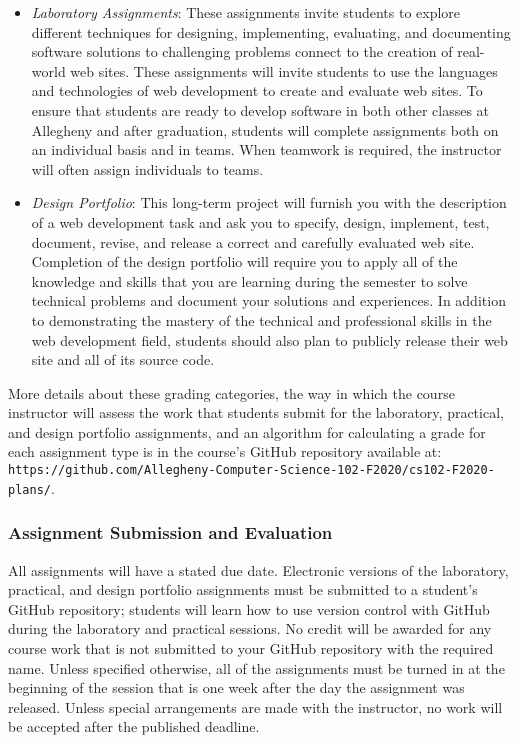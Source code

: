 \documentclass[11pt]{article}
\newcommand{\url}[1]{\lstinline{#1}}
\begin{document}
\begin{itemize}
  \item {\em Laboratory Assignments\/}: These assignments invite students to
    explore different techniques for designing, implementing, evaluating, and
    documenting software solutions to challenging problems connect to the
    creation of real-world web sites. These assignments will invite students to
    use the languages and technologies of web development to create and evaluate
    web sites. To ensure that students are ready to develop software in both
    other classes at Allegheny and after graduation, students will complete
    assignments both on an individual basis and in teams. When teamwork is
    required, the instructor will often assign individuals to teams.

  \item {\em Design Portfolio\/}: This long-term project will furnish you with
    the description of a web development task and ask you to specify, design,
    implement, test, document, revise, and release a correct and carefully
    evaluated web site. Completion of the design portfolio will require you to
    apply all of the knowledge and skills that you are learning during the
    semester to solve technical problems and document your solutions and
    experiences. In addition to demonstrating the mastery of the technical and
    professional skills in the web development field, students should also plan
    to publicly release their web site and all of its source code.

\end{itemize}

\noindent More details about these grading categories, the way in which the
course instructor will assess the work that students submit for the laboratory,
practical, and design portfolio assignments, and an algorithm for calculating a
grade for each assignment type is in the course's GitHub repository available
at:
\url{https://github.com/Allegheny-Computer-Science-102-F2020/cs102-F2020-plans/}.

\subsubsection*{Assignment Submission and Evaluation}

All assignments will have a stated due date. Electronic versions of the
laboratory, practical, and design portfolio assignments must be submitted to a
student's GitHub repository; students will learn how to use version control with
GitHub during the laboratory and practical sessions. No credit will be awarded
for any course work that is not submitted to your GitHub repository with the
required name. Unless specified otherwise, all of the assignments must be turned
in at the beginning of the session that is one week after the day the assignment
was released. Unless special arrangements are made with the instructor, no work
will be accepted after the published deadline.
\end{document}
